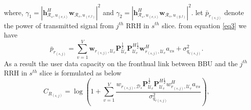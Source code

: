 \documentclass[conference]{IEEEtran}
\begin{document}
where, $\gamma_{1} =|\boldsymbol{h}_{\mathcal{R}_s, u_{(v,i)}}^H \boldsymbol{w}_{\mathcal{R}_{s},u_{(v,l)}}|^2$
and $\gamma_{2} =|\boldsymbol{h}_{\mathcal{R}_s, u_{(v,i)}}^H \boldsymbol{w}_{\mathcal{R}_{s},u_{(y,l)}}|^2$.
let $\bar{p}_{r_{(s,j)}}$ denote the power of transmitted signal from $j^{th}$ RRH in $s^{th}$ slice.
from equation \eqref{eq3} we have
\begin{equation}
\bar{p}_{r_{(s,j)}} = \sum_{v=1}^{V}\boldsymbol{w}_{r_{(s,j)},\mathcal{U}_{v}} \boldsymbol{P}_{\mathcal{U}_v}^{\frac{1}{2}} \boldsymbol{P}_{\mathcal{U}_v}^{H \frac{1}{2}}   \boldsymbol{w}_{r_{(s,j)},\mathcal{U}_{v}}^H a_{vs} + \sigma_{q_{r(s,j)}}^2.
\end{equation}
As a result the user data capacity on the fronthual link between BBU and the $j^{th}$ RRH in $s^{th}$ slice is formulated as below
\begin{equation}
C_{R_{(s,j)}} = \log{(1+\sum_{v=1}^{V}\frac{w_{r_{(s,j)},\mathcal{D}_{s}} \boldsymbol{P}_{\mathcal{U}_v}^{\frac{1}{2}} \boldsymbol{P}_{\mathcal{U}_v}^{H \frac{1}{2}}   w_{r_{(s,j)},\mathcal{U}_{v}}^H a_{vs}}{ \sigma_{q_{r(s,j)}}^2})},
\end{equation}
\end{document}
